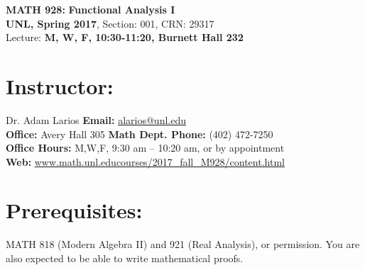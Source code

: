 \documentclass[margin]{res}
\theoremstyle{plain}
\theoremstyle{definition}
\theoremstyle{remark}
\begin{document}
\begin{center}
   \textbf{MATH 928:} 
   \textbf{Functional Analysis I}\\
   \textbf{UNL, Spring 2017}, Section: 001, CRN: 29317
    \\
   Lecture: \textbf{M, W, F, 10:30-11:20, Burnett Hall 232}\\
\end{center}
%
\vspace{-0.2in}
%
\begin{resume}
\section{Instructor:} Dr. Adam Larios 
\hfill \textbf{Email:} 
\url{alarios@unl.edu}
\\
\textbf{Office:} Avery Hall 305
\hfill
\textbf{Math Dept. Phone:} (402) 472-7250
\\
\textbf{Office Hours:} M,W,F, 9:30 am -- 10:20 am, or by appointment
\hfill
\\
\textbf{Web:} \url{www.math.unl.educourses/2017_fall_M928/content.html}



 \section{Prerequisites:} MATH 818 (Modern Algebra II) and 921 (Real Analysis), or permission.    You are also expected to be able to write mathematical proofs. 
 
 
 

\end{resume}
\end{document}
